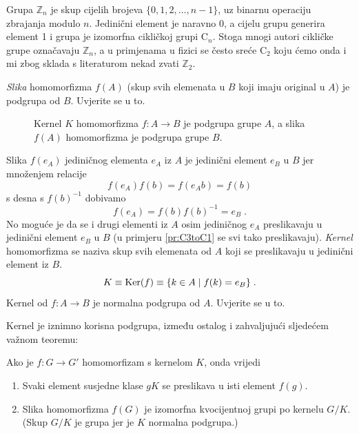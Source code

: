 \begin{primjer}    
    Grupa $\mathbb{Z}_n$ je skup cijelih brojeva $\{0, 1, 2, \ldots, n-1\}$,
    uz binarnu operaciju zbrajanja modulo $n$. Jedinični element je naravno 0,
    a cijelu grupu generira element 1 i grupa je izomorfna cikličkoj grupi $\mathrm{C}_n$.
    Stoga mnogi autori cikličke grupe označavaju $\mathbb{Z}_n$, a u primjenama u fizici
    se često sreće $\mathrm{C}_2$ koju ćemo onda i mi zbog sklada s literaturom
    nekad zvati $\mathbb{Z}_2$.
\end{primjer}

\emph{Slika} homomorfizma $f(A)$ (skup svih elemenata u $B$ koji imaju original u $A$) 
je podgrupa od $B$. Uvjerite se u to.


\begin{figure}[htpb]
    \centering
    
    \caption{Kernel $K$ homomorfizma $f:A\to B$ je podgrupa grupe $A$,
    a slika $f(A)$ homomorfizma je podgrupa grupe $B$.}
    \label{fig:kernelslika}
\end{figure}


Slika $f(e_A)$ jediničnog elementa $e_A$ iz $A$ je jedinični element $e_B$ u $B$ jer
množenjem relacije
$$ f(e_A) f(b) = f(e_A b) = f(b) $$
s desna s $f(b)^{-1}$ dobivamo
$$ f(e_A) = f(b) f(b)^{-1} = e_B \;. $$
No moguće je da se i drugi elementi iz $A$ osim jediničnog $e_A$ preslikavaju u 
jedinični element $e_B$ u $B$ (u primjeru \ref{pr:C3toC1} se svi tako preslikavaju).
\emph{Kernel} homomorfizma se naziva skup svih elemenata od $A$ koji se
preslikavaju u jedinični element iz $B$.
  
$$ K \equiv {\rm Ker}(f) \equiv \{ k\in A \; | \; f(k) = e_B \} \;. $$
Kernel od $f:A\to B$ je normalna podgrupa od $A$. Uvjerite se u to.

Kernel je iznimno korisna podgrupa, između ostalog i zahvaljujući sljedećem
važnom teoremu:
\begin{teorem}
\label{th:izomorfizam}
Ako je $f:G\to G'$ homomorfizam s kernelom $K$, onda vrijedi
\begin{enumerate}[itemsep=2pt]
\item Svaki element susjedne klase $gK$ se preslikava u isti element $f(g)$.
\item Slika homomorfizma $f(G)$ je izomorfna kvocijentnoj grupi po kernelu $G/K$.
(Skup $G/K$ je grupa jer je $K$ normalna podgrupa.)
\end{enumerate}
\end{teorem}
  


